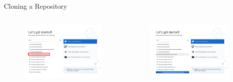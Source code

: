 \documentclass{beamer}
\begin{document}
    \begin{frame}{Cloning a Repository}
        \begin{columns}
            \begin{figure}
                \centering
                \includegraphics[width=\textwidth]{figures/clone_2.png}
            \end{figure}

            \begin{figure}
                \centering
                \includegraphics[width=\textwidth]{figures/clone_3.png}
            \end{figure}
        \end{columns}
    \end{frame}
\end{document}

